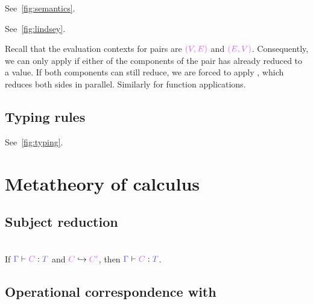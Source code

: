 \documentclass[main.tex]{subfiles}
\begin{document}

See~\cref{fig:semantics}.


See~\cref{fig:lindsey}.

Recall that the evaluation contexts for pairs are $\tm{(V, E)}$ and $\tm{(E, V)}$. Consequently, we can only apply  if either of the components of the pair has already reduced to a value. If both components can still reduce, we are forced to apply , which reduces both sides in parallel. Similarly for function applications.

\subsection{Typing rules}%
\label{sec:lvar-typing}

See~\cref{fig:typing}.

\section{Metatheory of \typedlambdalvar calculus}

\subsection{Subject reduction}

\begin{theorem}
  \hfill\\
  If $\seq{\ty{\Gamma}}{C}{T}$ and $\tm{C}\red\tm{C'}$, then $\seq{\ty{\Gamma}}{C}{T}$.
\end{theorem}


\subsection{Operational correspondence with \lambdalvar}


\end{document}
